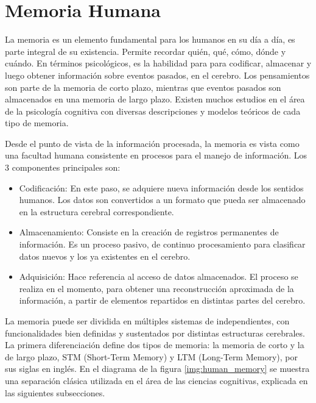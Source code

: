 
\section{Memoria Humana}


La memoria es un elemento fundamental para los humanos en su día a día, es parte integral de su existencia. Permite recordar quién, qué, cómo, dónde y cuándo. En términos psicológicos, es la habilidad para para codificar, almacenar y luego obtener información sobre eventos pasados, en el cerebro. Los pensamientos son parte de la memoria de corto plazo, mientras que eventos pasados son almacenados en una memoria de largo plazo. Existen muchos estudios en el área de la psicología cognitiva con diversas descripciones y modelos teóricos de cada tipo de memoria\cite{Vijayakumar2014}.

Desde el punto de vista de la información procesada, la memoria es vista como una facultad humana consistente en procesos para el manejo de información. Los 3 componentes principales son:

\begin{itemize}[topsep=0pt]
\setlength\itemsep{0.2em}
\item Codificación: En este paso, se adquiere nueva información desde los sentidos humanos. Los datos son convertidos a un formato que pueda ser almacenado en la estructura cerebral correspondiente.
\item Almacenamiento: Consiste en la creación de registros permanentes de información. Es un proceso pasivo, de continuo procesamiento para clasificar datos nuevos y los ya existentes en el cerebro.
\item Adquisición: Hace referencia al acceso de datos almacenados. El proceso se realiza en el momento, para obtener una reconstrucción aproximada de la información, a partir de elementos repartidos en distintas partes del cerebro.
\end{itemize}


La memoria puede ser dividida en múltiples sistemas de independientes, con funcionalidades bien definidas y sustentados por distintas estructuras cerebrales. La primera diferenciación define dos tipos de memoria: la memoria de corto y la de largo plazo, STM (Short-Term Memory) y LTM (Long-Term Memory), por sus siglas en inglés. En el diagrama de la figura \ref{img:human_memory} se muestra una separación clásica utilizada en el área de las ciencias cognitivas\cite{Eichenbaum:2008}, explicada en las siguientes subsecciones.

